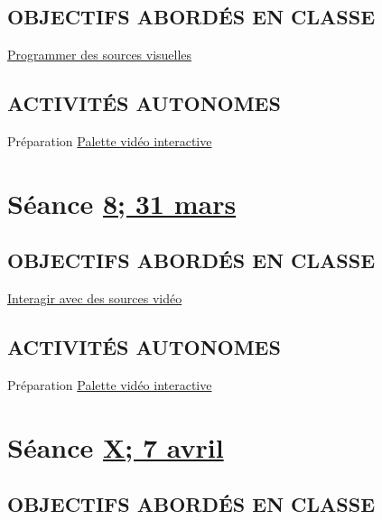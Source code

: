 \documentclass[
  french,
]{book}
\begin{document}
\hypertarget{objectifs-aborduxe9s-en-classe-7}{%
\subsection{OBJECTIFS ABORDÉS EN CLASSE}\label{objectifs-aborduxe9s-en-classe-7}}

\protect\hyperlink{programmer}{Programmer des sources visuelles}

\hypertarget{activituxe9s-autonomes-7}{%
\subsection{ACTIVITÉS AUTONOMES}\label{activituxe9s-autonomes-7}}

Préparation \protect\hyperlink{sommatif_4}{Palette vidéo interactive}

\hypertarget{semaine_9}{%
\section{\texorpdfstring{Séance \protect\hyperlink{semaine_9}{8; 31 mars}}{Séance 8; 31 mars}}\label{semaine_9}}

\hypertarget{objectifs-aborduxe9s-en-classe-8}{%
\subsection{OBJECTIFS ABORDÉS EN CLASSE}\label{objectifs-aborduxe9s-en-classe-8}}

\protect\hyperlink{interagir}{Interagir avec des sources vidéo}

\hypertarget{activituxe9s-autonomes-8}{%
\subsection{ACTIVITÉS AUTONOMES}\label{activituxe9s-autonomes-8}}

Préparation \protect\hyperlink{sommatif_4}{Palette vidéo interactive}

\hypertarget{semaine_10}{%
\section{\texorpdfstring{Séance \protect\hyperlink{semaine_10}{X; 7 avril}}{Séance X; 7 avril}}\label{semaine_10}}

\hypertarget{objectifs-aborduxe9s-en-classe-9}{%
\subsection{OBJECTIFS ABORDÉS EN CLASSE}\label{objectifs-aborduxe9s-en-classe-9}}
\end{document}
